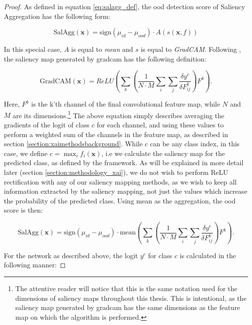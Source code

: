\documentclass[UKenglish]{uiomasterthesis} %
\theoremstyle{definition}
\begin{document}
\begin{proof}

As defined in equation \ref{eq:salagg_def}, the \ac{ood} detection score of Saliency Aggregation has the following form:

\begin{equation}
    \text{SalAgg}(\bm{x}) = \text{sign}(\mu_{id} - \mu_{ood}) \cdot A(s(\bm{x}, f))
\end{equation}

In this special case, $A$ is equal to {\it mean} and $s$ is equal to {\it GradCAM}. Following \cite{gradcam}, the saliency map generated by \ac{gradcam} has the following definition:

\begin{equation}
    \text{GradCAM}(\bm{x}) = ReLU\left(\sum_k \left( \frac{1}{N \cdot M} \sum_i \sum_j \frac{\delta y^c}{\delta F_{ij}^k} \right) F^k \right).
\end{equation}

Here, $F^k$ is the k'th channel of the final convolutional feature map, while $N$ and $M$ are its dimensions.\footnote{The attentive reader will notice that this is the same notation used for the dimensions of saliency maps throughout this thesis. This is intentional, as the saliency map generated by \ac{gradcam} has the same dimensions as the feature map on which the algorithm is performed.} The above equation simply describes averaging the gradients of the logit of class $c$ for each channel, and using these values to perform a weighted sum of the channels in the feature map, as described in section \ref{section:xaimethodsbackground}. While $c$ can be any class index, in this case, we define $c = \max_i f_i(\bm{x})$, i.e we calculate the saliency map for the predicted class, as defined by the framework. As will be explained in more detail later (section \ref{section:methodology_xai}), we do not wish to perform ReLU rectification with any of our saliency mapping methods, as we wish to keep all information extracted by the saliency mapping, not just the values which increase the probability of the predicted class. Using mean as the aggregation, the \ac{ood} score is then:

\begin{equation}
    \text{SalAgg}(\bm{x}) = \text{sign}(\mu_{id} - \mu_{ood}) \cdot \text{mean} \left(\sum_k \left( \frac{1}{N \cdot M} \sum_i \sum_j \frac{\delta y^c}{\delta F_{ij}^k} \right) F^k \right).
\end{equation}

For the network as described above, the logit $y^c$ for class $c$ is calculated in the following manner:


\end{proof}
\end{document}
